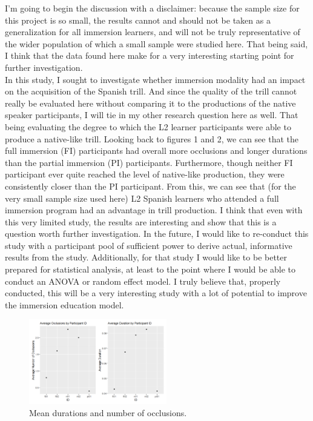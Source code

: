 \documentclass[
  a4paper,
  11pt,
  twocolumn]{article}
\begin{document}
I'm going to begin the discussion with a disclaimer: because the sample
size for this project is so small, the results cannot and should not be
taken as a generalization for all immersion learners, and will not be
truly representative of the wider population of which a small sample
were studied here. That being said, I think that the data found here
make for a very interesting starting point for further investigation.\\
In this study, I sought to investigate whether immersion modality had an
impact on the acquisition of the Spanish trill. And since the quality of
the trill cannot really be evaluated here without comparing it to the
productions of the native speaker participants, I will tie in my other
research question here as well. That being evaluating the degree to
which the L2 learner participants were able to produce a native-like
trill. Looking back to figures 1 and 2, we can see that the full
immersion (FI) participants had overall more occlusions and longer
durations than the partial immersion (PI) participants. Furthermore,
though neither FI participant ever quite reached the level of
native-like production, they were consistently closer than the PI
participant. From this, we can see that (for the very small sample size
used here) L2 Spanish learners who attended a full immersion program had
an advantage in trill production. I think that even with this very
limited study, the results are interesting and show that this is a
question worth further investigation. In the future, I would like to
re-conduct this study with a participant pool of sufficient power to
derive actual, informative results from the study. Additionally, for
that study I would like to be better prepared for statistical analysis,
at least to the point where I would be able to conduct an ANOVA or
random effect model. I truly believe that, properly conducted, this will
be a very interesting study with a lot of potential to improve the
immersion education model.

\begin{figure}[!ht]
\begin{center}
\includegraphics[width=6cm]{./includes/figures/fig2.png}
\caption{Mean durations and number of occlusions.}\label{fig:Means}
\end{center}
\end{figure}




\theendnotes
\end{document}
